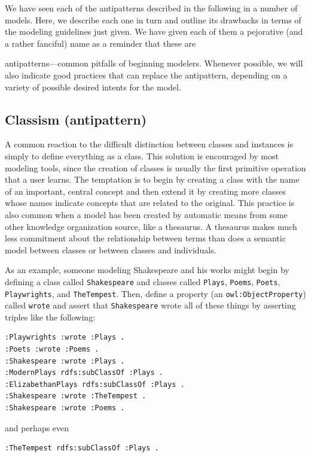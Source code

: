 We have seen each of the antipatterns described in the following in a
number of models. Here, we describe each one in turn and outline its
drawbacks in terms of the modeling guidelines just given. We have given
each of them a pejorative (and a rather fanciful) name as a reminder
that these are

antipatterns---common pitfalls of beginning modelers. Whenever possible,
we will also indicate good practices that can replace the antipattern,
depending on a variety of possible desired intents for the model.

\subsection{Classism (antipattern)}

A common reaction to the difficult distinction between classes and
instances is simply to define everything as a class. This solution is
encouraged by most modeling tools, since the creation of classes is
usually the first primitive operation that a user learns. The temptation
is to begin by creating a class with the name of an important, central
concept and then extend it by creating more classes whose names indicate
concepts that are related to the original. This practice is also common
when a model has been created by automatic means from some other
knowledge organization source, like a thesaurus. A thesaurus makes much
less commitment about the relationship between terms than does a
semantic model between classes or between classes and individuals.

As an example, someone modeling Shakespeare and his works might begin by
defining a class called \texttt{Shakespeare} and classes called \texttt{Plays}, \texttt{Poems},
\texttt{Poets}, \texttt{Playwrights}, and \texttt{TheTempest}. Then, define a property (an
\texttt{owl:ObjectProperty}) called \texttt{wrote} and assert that \texttt{Shakespeare} wrote all
of these things by asserting triples like the following:

\begin{lstlisting}
:Playwrights :wrote :Plays .
:Poets :wrote :Poems .
:Shakespeare :wrote :Plays .
:ModernPlays rdfs:subClassOf :Plays .
:ElizabethanPlays rdfs:subClassOf :Plays .
:Shakespeare :wrote :TheTempest . 
:Shakespeare :wrote :Poems .
\end{lstlisting}

and perhaps even

\begin{lstlisting}
:TheTempest rdfs:subClassOf :Plays .
\end{lstlisting}

